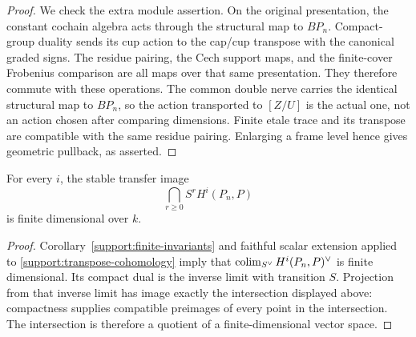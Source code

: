 \begin{proof}
We check the extra module assertion.  On the original
presentation, the constant cochain algebra acts through the
structural map to $BP_n$.  Compact-group duality sends its cup
action to the cap/cup transpose with the canonical graded
signs.  The residue pairing, the Cech support maps, and the
finite-cover Frobenius comparison are all maps over that same
presentation.  They therefore commute with these operations.
The common double nerve carries the identical structural map
to $BP_n$, so the action transported to $[Z/U]$ is the actual
one, not an action chosen after comparing dimensions.  Finite
etale trace and its transpose are compatible with the same
residue pairing.  Enlarging a frame level hence gives geometric
pullback, as asserted.
\end{proof}

\begin{corollary}\label{support:finite-stable-image}
For every $i$, the stable transfer image
\[
 \bigcap_{r\geq0}S^rH^i(P_n,P)
\]
is finite dimensional over $k$.
\end{corollary}

\begin{proof}
Corollary~\ref{support:finite-invariants} and faithful scalar
extension applied to \eqref{support:transpose-cohomology} imply
that $\operatorname*{colim}_{S^\vee}H^i(P_n,P)^\vee$ is finite dimensional.
Its compact dual is the inverse limit with transition $S$.
Projection from that inverse limit has image exactly the
intersection displayed above: compactness supplies compatible
preimages of every point in the intersection.  The intersection
is therefore a quotient of a finite-dimensional vector space.
\end{proof}
